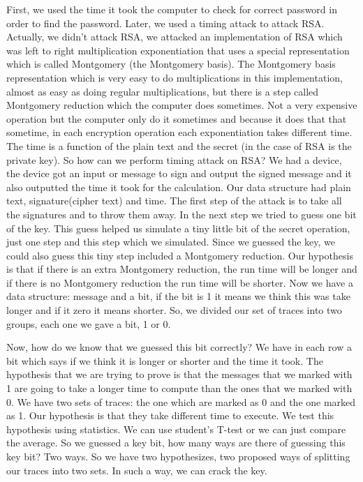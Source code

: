 First, we used the time it took the computer to check for correct password in
order to find the password. Later, we used a timing attack to attack RSA.
Actually, we didn't attack RSA, we attacked an implementation of RSA which was
left to right multiplication exponentiation that uses a special representation
which is called Montgomery (the Montgomery basis). The Montgomery basis
representation which is very easy to do multiplications in this implementation,
almost as easy as doing regular multiplications, but there is a step called
Montgomery reduction which the computer does sometimes. Not a very expensive
operation but the computer only do it sometimes and because it does that that
sometime, in each encryption operation each exponentiation takes different time.
The time is a function of the plain text and the secret (in the case of RSA is
the private key). So how can we perform timing attack on RSA? We had a device,
the device got an input or message to sign and output the signed message and it
also outputted the time it took for the calculation. Our data structure had
plain text, signature(cipher text) and time.  The first step of the attack is to
take all the signatures and to throw them away. In the next step we tried to
guess one bit of the key. This guess helped us simulate a tiny little bit of the
secret operation, just one step and this step which we simulated. Since we
guessed the key, we could also guess this tiny step included a Montgomery
reduction. Our hypothesis is that if there is an extra Montgomery reduction, the
run time will be longer and if there is no Montgomery reduction the run time
will be shorter. Now we have a data structure: message and a bit, if the bit is
1 it means we think this was take longer and if it zero it means shorter. So, we
divided our set of traces into two groups, each one we gave a bit, 1 or 0. 

Now, how do we know that we guessed this bit correctly? We have in each row a
bit which says if we think it is longer or shorter and the time it took. The
hypothesis that we are trying to prove is that the messages that we marked with
1 are going to take a longer time to compute than the ones that we marked with
0. We have two sets of traces: the one which are marked as 0 and the one marked
as 1. Our hypothesis is that they take different time to execute. We test this
hypothesis using statistics. We can use student's T-test or we can just compare
the average. So we guessed a key bit, how many ways are there of guessing this
key bit? Two ways. So we have two hypothesizes, two proposed ways of splitting
our traces into two sets. In such a way, we can crack the key.

